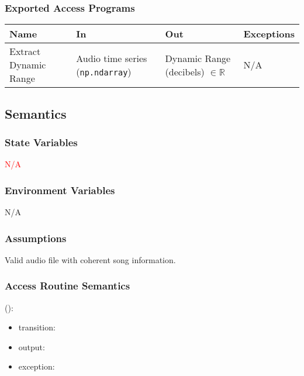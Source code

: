 \documentclass[12pt, titlepage]{article}
\begin{document}
\subsubsection{Exported Access Programs}

\begin{center}
\begin{tabular}{p{2cm} p{4cm} p{4cm} p{2cm}}
\hline
\textbf{Name} & \textbf{In} & \textbf{Out} & \textbf{Exceptions}\\
\hline%
Extract Dynamic Range &Audio time series (\texttt{np.ndarray}) &Dynamic Range (decibels) $\in \mathbb{R}$ &N/A\\
\hline
\end{tabular}
\end{center}

\subsection{Semantics}

\subsubsection{State Variables}
\textcolor{red}{N/A}

\subsubsection{Environment Variables}
N/A

\subsubsection{Assumptions}
Valid audio file with coherent song information.

\subsubsection{Access Routine Semantics}

\noindent {}():
\begin{itemize}
\item transition:  
\item output:  
\item exception:  
\end{itemize}

\end{document}
